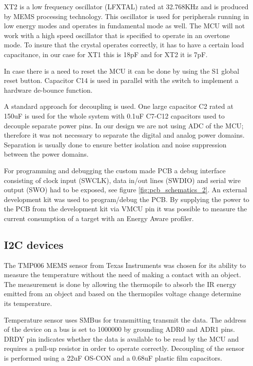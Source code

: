 XT2 is a low frequency oscillator (LFXTAL) rated at 32.768KHz and is produced by MEMS processing technology. This oscillator is used for peripherals running in low energy modes and operates in fundamental mode as well. The MCU will not work with a high speed oscillator that is specified to operate in an overtone mode. To insure that the crystal operates correctly, it has to have a certain load capacitance, in our case for XT1 this is 18pF and for XT2 it is 7pF. 

In case there is a need to reset the MCU it can be done by using the S1 global reset button. Capacitor C14 is used in parallel with the switch to implement a hardware de-bounce function. 

A standard approach for decoupling is used. One large capacitor C2 rated at 150uF is used for the whole system with 0.1uF C7-C12 capacitors used to decouple separate power pins. In our design we are not using ADC of the MCU; therefore it was not necessary to separate the digital and analog power domains. Separation is usually done to ensure better isolation and noise suppression between the power domains.


For programming and debugging the custom made PCB a debug interface consisting of clock input (SWCLK), data in/out lines (SWDIO) and serial wire output (SWO) had to be exposed, see figure \ref{fig:pcb_schematics_2}. An external development kit was used to program/debug the PCB. By supplying the power to the PCB from the development kit via VMCU pin it was possible to measure the current consumption of a target with an Energy Aware profiler.


\subsection{I2C devices}
The TMP006 MEMS sensor from Texas Instruments was chosen for its ability to measure the temperature without the need of making a contact with an object. The measurement is done by allowing the thermopile to absorb the IR energy emitted from an object and based on the thermopiles voltage change determine its temperature.

Temperature sensor uses SMBus for transmitting transmit the data. The address of the device on a bus is set to 1000000 by grounding ADR0 and ADR1 pins. DRDY pin indicates whether the data is available to be read by the MCU and requires a pull-up resistor in order to operate correctly. Decoupling of the sensor is performed using a 22uF OS-CON and a 0.68uF plastic film capacitors.

